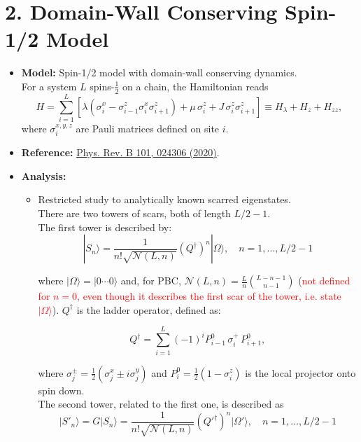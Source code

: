 \documentclass[11pt]{article}
\begin{document}
\section*{2. Domain-Wall Conserving Spin-1/2 Model}
\begin{itemize}
    \item \textbf{Model:} Spin-1/2 model with domain-wall conserving dynamics.\\
    
     For a system $L$ spins-$\tfrac{1}{2}$ on a chain, the Hamiltonian reads
	\begin{equation}
	H = \sum_{i=1}^{L} \left[ \lambda \left( \sigma^x_i - \sigma^z_{i-1} \sigma^x_i \sigma^z_{i+1} \right) + \mu\, \sigma^z_i + J\, \sigma^z_i \sigma^z_{i+1} \right]
	\equiv H_\lambda + H_z + H_{zz},
	\label{eq:H}
	\end{equation}
    where $\sigma^{x,y,z}_i$ are Pauli matrices defined on site $i$.

	

    \item \textbf{Reference:} \href{https://journals.aps.org/prb/pdf/10.1103/PhysRevB.101.024306}{Phys. Rev. B 101, 024306 (2020)}.
    \item \textbf{Analysis:}
    \begin{itemize}
        \item Restricted study to analytically known scarred eigenstates.\\ There are two towers of scars, both of length $L/2 - 1$.\\
         The first tower is described by:
	 \begin{equation}
	|S_n\rangle = \frac{1}{n! \sqrt{\mathcal{N}(L, n)}} \left(Q^\dagger\right)^n |\Omega\rangle, \quad n = 1,\hdots,L/2 - 1
	\end{equation}
	
	where $|\Omega\rangle = |0 \cdots 0\rangle$ and, for PBC, $\mathcal{N}(L, n) = \frac{L}{n} \binom{L - n - 1}{n - 1}$ (\textcolor{red}{not defined for $n=0$, even though it describes the first scar of the tower, i.e. state $|\Omega\rangle $}). $Q^\dagger$ is 	the ladder operator, defined as:
	
	\begin{equation}
	Q^\dagger = \sum_{i = 1}^{L} (-1)^i P^0_{i-1} \, \sigma^+_i \, P^0_{i+1}, 
	\end{equation}
	
	where $\sigma_j^\pm = \frac{1}{2} (\sigma_j^x \pm i \sigma_j^y)$ and $P^0_i = \frac{1}{2} (1 - \sigma^z_i)$ is the local projector onto spin down.\\
        The second tower, related to the first one, is described as 
        \begin{equation}
	|S'_n\rangle = G |S_n\rangle = \frac{1}{n! \sqrt{\mathcal{N}(L, n)}} \left(Q'^\dagger\right)^n |\Omega'\rangle, \quad n = 1,\hdots,L/2 - 1
	\end{equation}
	

\end{itemize}
\end{itemize}
\end{document}
